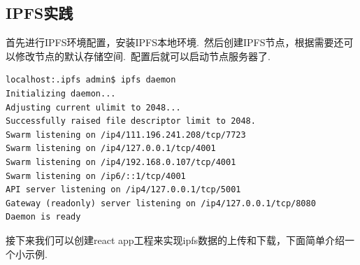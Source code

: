 \documentclass[a4paper,12pt,titlepage]{ctexart}
\begin{document}
\subsection{IPFS实践}
首先进行IPFS环境配置，安装IPFS本地环境.~然后创建IPFS节点，根据需要还可以修改节点的默认存储空间.~配置后就可以启动节点服务器了.~\par
\begin{verbatim}
localhost:.ipfs admin$ ipfs daemon
Initializing daemon...
Adjusting current ulimit to 2048...
Successfully raised file descriptor limit to 2048.
Swarm listening on /ip4/111.196.241.208/tcp/7723
Swarm listening on /ip4/127.0.0.1/tcp/4001
Swarm listening on /ip4/192.168.0.107/tcp/4001
Swarm listening on /ip6/::1/tcp/4001
API server listening on /ip4/127.0.0.1/tcp/5001
Gateway (readonly) server listening on /ip4/127.0.0.1/tcp/8080
Daemon is ready
\end{verbatim}\par
接下来我们可以创建react app工程来实现ipfs数据的上传和下载，下面简单介绍一个小示例.~
\end{document}
